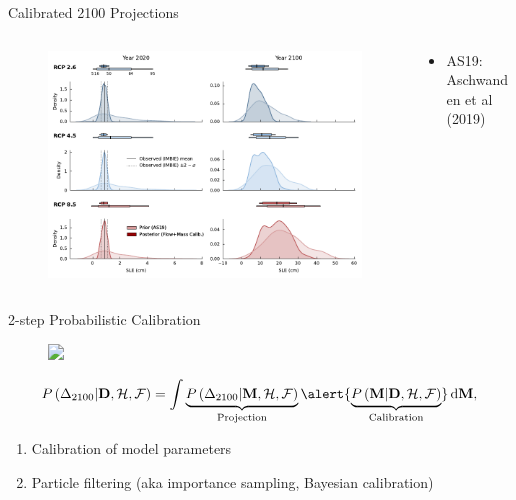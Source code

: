 \documentclass[aspectratio=169,hide notes,intlimits]{beamer}
\begin{document}
\begin{frame}
  \titlepage
\end{frame}

  {
}

\begin{frame}{Calibrated 2100 Projections}
        \begin{columns}[c]
    \begin{column}{.8\textwidth}
    \begin{figure}
      \includegraphics[height=7.cm]{sle_pdf_prior_posterior_w_obs_2020_2100}
    \end{figure}
    \end{column}
    \begin{column}{.25\textwidth}
\begin{itemize}\setlength\itemsep{.25em}
    \item AS19: Aschwanden et al (2019)
\end{itemize}
    \end{column}
  \end{columns}
\end{frame}


\begin{frame}{2-step Probabilistic Calibration}
  \begin{figure}
    \includegraphics<1>[width=10cm]{slr-probability}    
  \end{figure}
\begin{equation*}
P\left(\Delta_{2100} | \mathbf{D}, \mathcal{H}, \mathcal{F} \right)
 = \int \underbrace{P\left(\Delta_{2100} | \mathbf{M},\mathcal{H}, \mathcal{F} \right)}_{\text{Projection}} \alert{\underbrace{P\left(\mathbf{M} | \mathbf{D},\mathcal{H}, \mathcal{F} \right)}_{\text{Calibration}}}\, \mathrm{d} \mathbf{M},
\end{equation*}
\begin{enumerate}
\item Calibration of model parameters
\item Particle filtering (aka importance sampling, Bayesian calibration)
\end{enumerate}
\end{frame}
\end{document}
